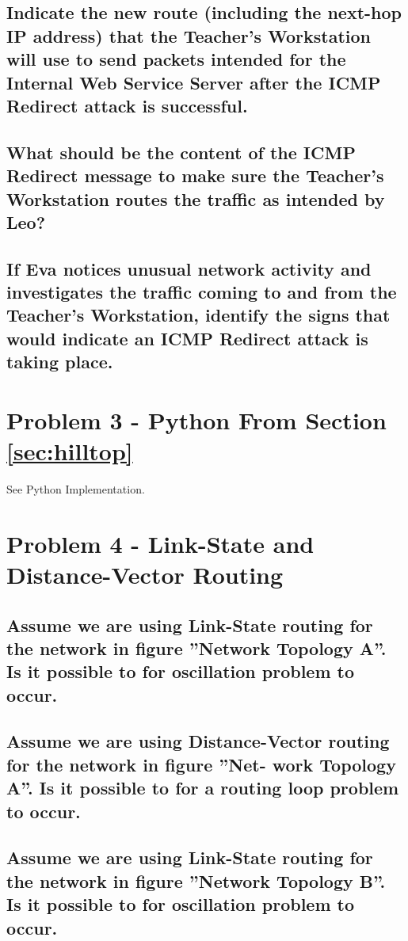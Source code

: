 \documentclass{article}
\begin{document}
\subsection{Indicate the new route (including the next-hop IP address) that the Teacher’s
Workstation will use to send packets intended for the Internal Web Service Server after
the ICMP Redirect attack is successful.}

\subsection{What should be the content of the ICMP Redirect message to make sure the
Teacher’s Workstation routes the traffic as intended by Leo?}

\subsection{If Eva notices unusual network activity and investigates the traffic coming to
and from the Teacher’s Workstation, identify the signs that would indicate an ICMP
Redirect attack is taking place.}

\section{Problem 3 - Python From Section \ref{sec:hilltop}}

See Python Implementation.

\section{Problem 4 - Link-State and Distance-Vector Routing}

\subsection{Assume we are using Link-State routing for the network in figure  ”Network
Topology A”. Is it possible to for oscillation problem to occur.}

\subsection{Assume we are using Distance-Vector routing for the network in figure ”Net-
work Topology A”. Is it possible to for a routing loop problem to occur.}

\subsection{Assume we are using Link-State routing for the network in figure ”Network
Topology B”. Is it possible to for oscillation problem to occur.}
\end{document}
